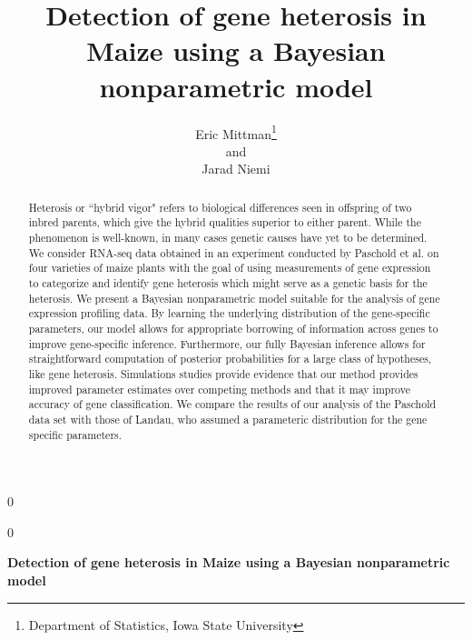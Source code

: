 \documentclass[12pt]{article}
\newcommand{\blind}{0}
\begin{document}
\newtoggle{thesis}
\toggletrue{thesis}
% 

\def\spacingset#1{\renewcommand{\baselinestretch}%
{#1}\small\normalsize} \spacingset{1}


\blind
{
  \title{\bf Detection of gene heterosis in Maize using a Bayesian nonparametric model}
  \author{Eric Mittman\thanks{Department of Statistics, Iowa State University}\\
    and\\
    Jarad Niemi\footnotemark[1]}
  \maketitle
} \fi

\blind
{
  \bigskip
  \bigskip
  \bigskip
  \begin{center}
    {\LARGE\bf Detection of gene heterosis in Maize using a Bayesian nonparametric model}
\end{center}
  \medskip
} \fi

\bigskip
\begin{abstract}
Heterosis or ``hybrid vigor" refers to biological differences seen in offspring of two inbred parents, which give the hybrid qualities superior to either parent. While the phenomenon is well-known, in many cases genetic causes have yet to be determined. We consider RNA-seq data obtained in an experiment conducted by Paschold et al. on four varieties of maize plants with the goal of using measurements of gene expression to categorize and identify gene heterosis which might serve as a genetic basis for the heterosis. We present a Bayesian nonparametric model suitable for the analysis of gene expression profiling data. By learning the underlying distribution of the gene-specific parameters, our model allows for appropriate borrowing of information across genes to improve gene-specific inference. Furthermore, our fully Bayesian inference allows for straightforward computation of posterior probabilities for a large class of hypotheses, like gene heterosis. Simulations studies provide evidence that our method provides improved parameter estimates over competing methods and that it may improve accuracy of gene classification. We compare the results of our analysis of the Paschold data set with those of Landau, who assumed a parameteric distribution for the gene specific parameters.

\end{abstract}
\end{document}
